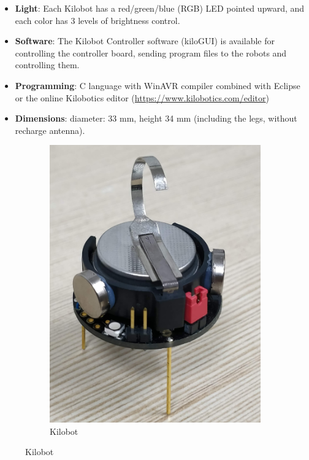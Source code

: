 \documentclass{report}[12pt]
\begin{document}
\begin{itemize}
\item \textbf{Light}: Each Kilobot has a red/green/blue (RGB) LED pointed
upward, and each color has 3 levels of brightness control. 
\item \textbf{Software}: The Kilobot Controller software (kiloGUI) is available for controlling the controller board, sending program files to
the robots and controlling them.
\item \textbf{Programming}: C language with WinAVR compiler combined with Eclipse or the online Kilobotics editor (\url{https://www.kilobotics.com/editor})
\item \textbf{Dimensions}: diameter: 33 mm, height 34 mm (including the legs,
without recharge antenna). 
\end{itemize}

\begin{figure}[H]
	\begin{subfigure}{0.45\textwidth}
		\centering
		\includegraphics[scale=0.04]{images/kilobots}
		\caption{Kilobot}

\end{subfigure}
\end{figure}
\end{document}
